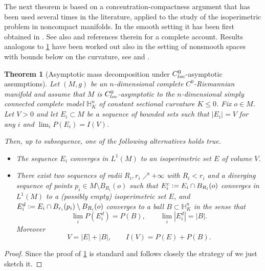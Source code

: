 \documentclass[a4paper,12pt,reqno]{amsart}
\numberwithin{equation}{section}
\theoremstyle{plain}
\newtheorem{theorem}{Theorem}[section]
\theoremstyle{definition}
\theoremstyle{remark}
\newcommand{\eqdef}{\ensuremath{\vcentcolon=}}
\begin{document}
{The next theorem is based on a concentration-compactness argument that has been used several times in the literature, applied to the study of the isoperimetric problem in noncompact manifolds. In the smooth setting it has been first obtained in \cite[Theorem 2]{Nardulli}. See also \cite[Theorem 4.48]{RitoreBook} and references therein for a complete account.  Results analogous to \cref{thm:MassDecompositionC0} have been worked out also in the setting of nonsmooth spaces with bounds below on the curvature, see \cite[Theorem 4.6]{AFP21} and  \cite[Theorem 3.3 \& Theorem 1.1]{ANP}. 


\begin{theorem}[Asymptotic mass decomposition under $C^0_{\rm loc}$-asymptotic assumptions]\label{thm:MassDecompositionC0}
Let $(M, g)$ be an $n$-dimensional complete $C^0$-Riemannian manifold and assume that $M$ is $C^0_{\rm loc}$-asymptotic to the $n$-dimensional simply connected complete model $\mathbb H^n_K$ of constant sectional curvature $K\le 0$. Fix $o \in M$. Let $V>0$ and let $E_i\subset M$ be a sequence of bounded sets such that $|E_i|=V$ for any $i$ and $\lim_i P(E_i)= I(V)$.

Then, up to subsequence, one of the following alternatives holds true.
\begin{itemize}
    \item The sequence $E_i$ converges in $L^1(M)$ to an isoperimetric set $E$ of volume $V$.

    \item There exist two sequences of radii $R_i, r_i\nearrow+\infty$ with $R_i<r_i$ and a diverging sequence of points $p_i \in M\setminus B_{R_i}(o)$ such that $E_i^c\eqdef E_i \cap B_{R_i}(o)$ converges in $L^1(M)$ to a (possibly empty) isoperimetric set $E$, and $E_i^d\eqdef E_i \cap B_{r_i}(p_i) \setminus B_{R_i}(o)$ converges
    to a ball $B\subset \mathbb H^n_K$ in the sense that
    \[
    \lim_i P(E_i^d) = P(B) , 
        \qquad
    \lim_i |E_i^d| = |B|.
    \]
    Moreover
    \begin{equation*}
        V= |E| + |B|,
        \qquad
        I(V) = P(E) + P(B) .
    \end{equation*}
\end{itemize}
\end{theorem}

\begin{proof}
{
Since the proof of \cref{thm:MassDecompositionC0} is standard and follows closely the strategy of \cite{AFP21, ANP} we just sketch it. 

}
\end{proof}}
\end{document}
